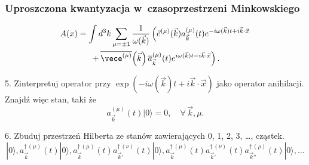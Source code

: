 \documentclass[10pt,t]{beamer}
\begin{document}
\begin{frame}
  \frametitle{Uproszczona kwantyzacja w~czasoprzestrzeni Minkowskiego}


  \begin{equation}
    \label{eq:Czemu-rozwazanie-05}
    \begin{split}
      A( x )
      &=
        \int d^{ 3 }k \sum_{ \mu = \pm 1 } \frac{ 1 }{ \omega( \vec{ k } ) }
        \left( \vec{ e }^{ ( \mu ) }( \vec{ k } ) a_{ \vec{ k } }^{ ( \mu ) }( t )
        e^{ -i \omega( \vec{ k } ) t + i \vec{ k } \cdot \vec{ x } } \right. \\
      &\hspace{1.5em}
        \left. + \, \overline{ \vece^{ ( \mu ) } }\!\left( \vec{ k } \right)
        \overline{ a }_{ \vec{ k } }^{ ( \mu ) }( t )
        e^{ i \omega( \vec{ k } ) t - i \vec{ k } \cdot \vec{ x } } \right).
    \end{split}
  \end{equation}

  \vspace{-1.5em}



  5. Zinterpretuj operator przy
  $\exp( -i \omega( \vec{ k } ) t + i \vec{ k } \cdot \vec{ x } )$
  jako operator anihilacji. Znajdź więc stan, taki że
  \begin{equation}
    \label{eq:Czemu-rozwazanie-06}
    a_{ \vec{ k } }^{ ( \mu ) }( t ) | 0 \rangle = 0, \quad
    \forall \, \vec{ k }, \mu.
  \end{equation}

  \vspace{-1em}



  6. Zbuduj przestrzeń Hilberta ze stanów zawierających 0, 1, 2, 3, \ldots,
  cząstek.
  \begin{equation}
    \label{eq:Czemu-rozwazanie-07}
    | 0 \rangle, a^{ \dagger \, ( \mu ) }_{ \vec{ k } }( t ) | 0 \rangle,
    a^{ \dagger \, ( \mu ) }_{ \vec{ k } }( t ) a^{ \dagger \, ( \nu ) }_{ \vec{ k }' }( t )
    | 0 \rangle,
    a^{ \dagger \, ( \mu ) }_{ \vec{ k } }( t ) a^{ \dagger \, ( \nu ) }_{ \vec{ k }' }( t )
    a^{ \dagger \, ( \rho ) }_{ \vec{ k }'' }( t ) | 0 \rangle, \ldots
  \end{equation}

\end{frame}
\end{document}
